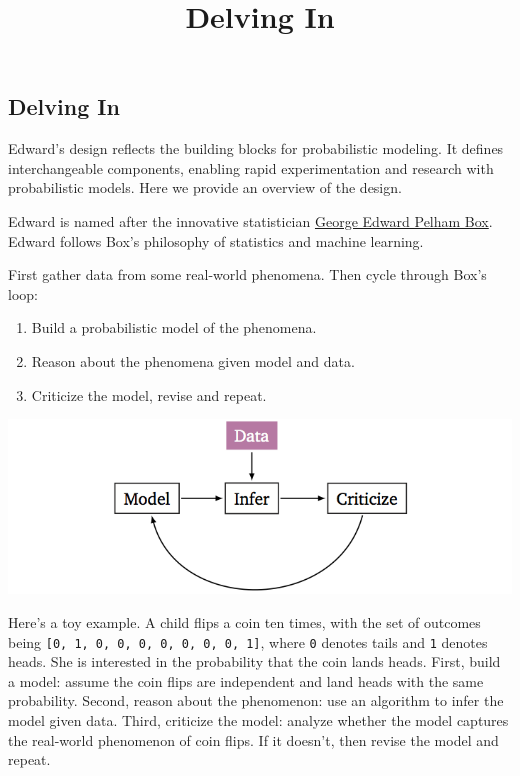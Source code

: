 \title{Delving In}

\subsection{Delving In}

Edward's design reflects the building blocks for probabilistic
modeling. It defines interchangeable components, enabling rapid
experimentation and research with probabilistic models. Here we
provide an overview of the design.

Edward is named after the innovative statistician
\href{https://en.wikipedia.org/wiki/George_E._P._Box}{George Edward
Pelham Box}. Edward follows Box's philosophy of statistics and machine
learning.

First gather data from some real-world phenomena. Then cycle through Box's
loop:

\begin{enumerate}
\item Build a probabilistic model of the phenomena.
\item Reason about the phenomena given model and data.
\item Criticize the model, revise and repeat.
\end{enumerate}

\includegraphics{images/model_infer_criticize.png}

Here's a toy example. A child flips a coin ten times, with the set of
outcomes being \texttt{{[}0,\ 1,\ 0,\ 0,\ 0,\ 0,\ 0,\ 0,\ 0,\ 1{]}},
where \texttt{0} denotes tails and \texttt{1} denotes heads. She
is interested in the probability that the coin lands heads. First,
build a model: assume the coin flips are independent and land heads with
the same probability. Second, reason about the phenomenon: use an algorithm
to infer the model given data. Third, criticize the model: analyze
whether the model captures the real-world phenomenon of coin flips. If it
doesn't, then revise the model and repeat.

